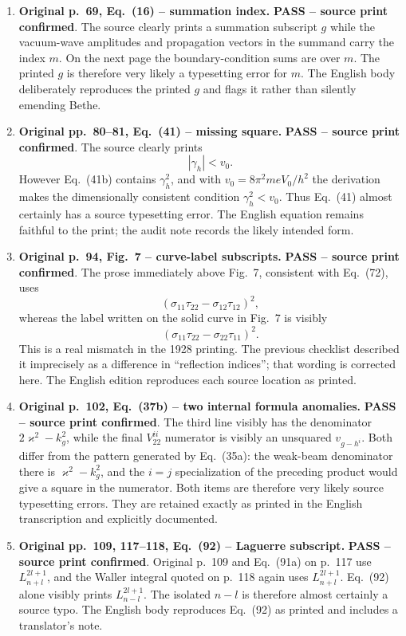 \documentclass[10pt]{article}
\newcommand{\pass}{\textbf{PASS -- source print confirmed}}
\begin{document}
\begin{enumerate}[leftmargin=1.55em]
\item \textbf{Original p.~69, Eq.~(16) -- summation index.} \pass. The source clearly prints a summation subscript $g$ while the vacuum-wave amplitudes and propagation vectors in the summand carry the index $m$. On the next page the boundary-condition sums are over $m$. The printed $g$ is therefore very likely a typesetting error for $m$. The English body deliberately reproduces the printed $g$ and flags it rather than silently emending Bethe.

\item \textbf{Original pp.~80--81, Eq.~(41) -- missing square.} \pass. The source clearly prints
\[
|\gamma_h|<v_0.
\]
However Eq.~(41b) contains $\gamma_h^2$, and with $v_0=8\pi^2meV_0/h^2$ the derivation makes the dimensionally consistent condition $\gamma_h^2<v_0$. Thus Eq.~(41) almost certainly has a source typesetting error. The English equation remains faithful to the print; the audit note records the likely intended form.

\item \textbf{Original p.~94, Fig.~7 -- curve-label subscripts.} \pass. The prose immediately above Fig.~7, consistent with Eq.~(72), uses
\[
(\sigma_{11}\tau_{22}-\sigma_{12}\tau_{12})^2,
\]
whereas the label written on the solid curve in Fig.~7 is visibly
\[
(\sigma_{11}\tau_{22}-\sigma_{22}\tau_{11})^2.
\]
This is a real mismatch in the 1928 printing. The previous checklist described it imprecisely as a difference in ``reflection indices''; that wording is corrected here. The English edition reproduces each source location as printed.

\item \textbf{Original p.~102, Eq.~(37b) -- two internal formula anomalies.} \pass. The third line visibly has the denominator $2\varkappa^2-k_g^2$, while the final $V_{22}^{ii}$ numerator is visibly an unsquared $v_{g-h^i}$. Both differ from the pattern generated by Eq.~(35a): the weak-beam denominator there is $\varkappa^2-k_g^2$, and the $i=j$ specialization of the preceding product would give a square in the numerator. Both items are therefore very likely source typesetting errors. They are retained exactly as printed in the English transcription and explicitly documented.

\item \textbf{Original pp.~109, 117--118, Eq.~(92) -- Laguerre subscript.} \pass. Original p.~109 and Eq.~(91a) on p.~117 use $L_{n+l}^{2l+1}$, and the Waller integral quoted on p.~118 again uses $L_{n+l}^{2l+1}$. Eq.~(92) alone visibly prints $L_{n-l}^{2l+1}$. The isolated $n-l$ is therefore almost certainly a source typo. The English body reproduces Eq.~(92) as printed and includes a translator's note.
\end{enumerate}
\end{document}
